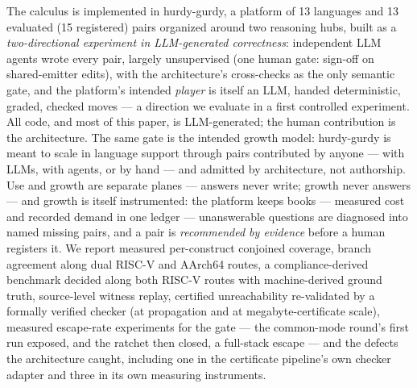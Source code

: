 The calculus is implemented in hurdy-gurdy, a platform of 13 languages
and 13\ifarxiv{} evaluated (15 registered)\fi{}
pairs organized around two reasoning hubs, built as a \emph{two-directional
experiment in LLM-generated correctness}: independent LLM agents wrote
every pair, largely unsupervised (one human gate: sign-off on
shared-emitter edits), with the architecture's cross-checks
as the only semantic gate, and the platform's intended \emph{player} is
itself an LLM, handed deterministic, graded, checked moves --- a
direction we evaluate in a first controlled experiment. All code,
and most of this paper, is LLM-generated; the human contribution is the
architecture. The same gate is the intended growth model: hurdy-gurdy is meant
to scale in language support through pairs contributed by anyone ---
with LLMs, with agents, or by hand --- and admitted by architecture,
not authorship.\ifarxiv{} Use and growth are separate planes --- answers never write; growth never answers --- and growth is itself instrumented: the platform
keeps books --- measured cost and recorded demand in one ledger ---
unanswerable questions are diagnosed into named missing pairs, and a
pair is \emph{recommended by evidence} before a human registers
it.\fi{} We report measured per-construct conjoined coverage,
branch agreement along dual RISC-V and AArch64 routes, a
compliance-derived benchmark decided along both RISC-V routes with
machine-derived ground truth, source-level
witness replay, certified unreachability re-validated by a formally
verified checker (at propagation and at megabyte-certificate scale),
measured escape-rate experiments for the gate --- the common-mode
round's first run exposed, and the ratchet then closed, a full-stack
escape --- and the defects the
architecture caught, including one in the certificate pipeline's own
checker adapter and three in its own measuring instruments.
